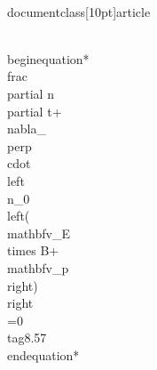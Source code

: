 \\documentclass[10pt]{article}
\begin{document}
{{{{{\\begin{equation*}
\\frac{\\partial n}{\\partial t}+\\nabla_{\\perp} \\cdot\\left\\{n_{0}\\left(\\mathbf{v}_{E \\times B}+\\mathbf{v}_{p}\\right)\\right\\}=0 \\tag{8.57}
\\end{equation*}


}}}}}
\end{document}
